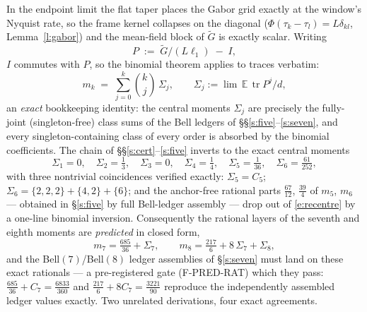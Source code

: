 \documentclass[11pt]{article}
\numberwithin{equation}{section}
\theoremstyle{definition}
\theoremstyle{remark}
\begin{document}
In the endpoint limit the flat taper places the Gabor grid
exactly at the window's Nyquist rate, so the frame kernel
collapses on the diagonal ($\Phi(\tau_k-\tau_l)=L\delta_{kl}$,
Lemma~\ref{l:gabor}) and the mean-field block of
$\widetilde G$ is exactly scalar. Writing
\[
P\;:=\;\widetilde G/(L\ell_1)\;-\;I ,
\]
$I$ commutes with $P$, so the binomial theorem applies to
traces verbatim:
\begin{equation}\label{e:recentre}
m_k\;=\;\sum_{j=0}^{k}\binom{k}{j}\,\Sigma_j,
\qquad \Sigma_j:=\lim\,\mathbb E\,
\operatorname{tr}P^{j}/d ,
\end{equation}
an \emph{exact} bookkeeping identity: the central moments
$\Sigma_j$ are precisely the fully-joint (singleton-free)
class sums of the Bell ledgers of
\S\S\ref{s:five}--\ref{s:seven}, and every
singleton-containing class of every order is absorbed by the
binomial coefficients. The chain of
\S\S\ref{s:cert}--\ref{s:five} inverts to the exact central
moments
\begin{equation}\label{e:sigmas}
\Sigma_1=0,\quad \Sigma_2=\tfrac13,\quad \Sigma_3=0,\quad
\Sigma_4=\tfrac14,\quad \Sigma_5=\tfrac1{36},\quad
\Sigma_6=\tfrac{61}{252},
\end{equation}
with three nontrivial coincidences verified exactly:
$\Sigma_5=C_5$; $\Sigma_6=\{2,2,2\}+\{4,2\}+\{6\}$; and the
anchor-free rational parts $\tfrac{67}{12}$, $\tfrac{39}4$ of
$m_5$, $m_6$ --- obtained in \S\ref{s:five} by full Bell-ledger
assembly --- drop out of \eqref{e:recentre} by a one-line
binomial inversion. Consequently the rational layers of the
seventh and eighth moments are \emph{predicted} in closed form,
\begin{equation}\label{e:rat78}
m_7=\tfrac{685}{36}+\Sigma_7,
\qquad
m_8=\tfrac{217}{6}+8\,\Sigma_7+\Sigma_8,
\end{equation}
and the Bell$(7)$/Bell$(8)$ ledger assemblies of
\S\ref{s:seven} must land on these exact rationals --- a
pre-registered gate (F-PRED-RAT) which they pass:
$\tfrac{685}{36}+C_7=\tfrac{6833}{360}$ and
$\tfrac{217}6+8C_7=\tfrac{3221}{90}$ reproduce the
independently assembled ledger values exactly. Two unrelated
derivations, four exact agreements.
\end{document}
